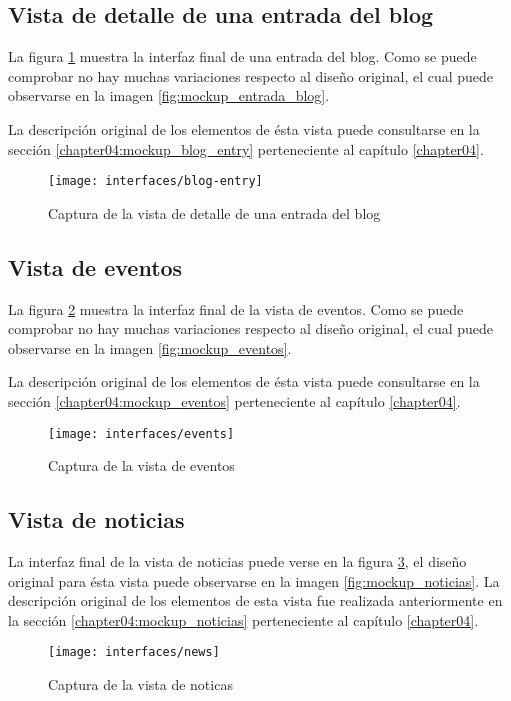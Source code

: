 \subsection{Vista de detalle de una entrada del blog}
La figura \ref{fig:interface_blog_entry} muestra la interfaz final de una entrada del blog.  Como se puede comprobar no hay muchas variaciones respecto al diseño original, el cual puede observarse en la imagen \ref{fig:mockup_entrada_blog}.

La descripción original de los elementos de ésta vista puede consultarse en la sección \ref{chapter04:mockup_blog_entry} perteneciente al capítulo \ref{chapter04}.

\begin{figure}[h]
	\centering
	\texttt{[image: interfaces/blog-entry]}
	\caption{Captura de la vista de detalle de una entrada del blog}
	\label{fig:interface_blog_entry}
\end{figure}

\subsection{Vista de eventos}
La figura \ref{fig:interface_eventos} muestra la interfaz final de la vista de eventos.  Como se puede comprobar no hay muchas variaciones respecto al diseño original, el cual puede observarse en la imagen \ref{fig:mockup_eventos}.

La descripción original de los elementos de ésta vista puede consultarse en la sección \ref{chapter04:mockup_eventos} perteneciente al capítulo \ref{chapter04}.

\begin{figure}[h]
	\centering
	\texttt{[image: interfaces/events]}
	\caption{Captura de la vista de eventos}
	\label{fig:interface_eventos}
\end{figure}


\subsection{Vista de noticias}
La interfaz final de la vista de noticias puede verse en la figura \ref{fig:interface_noticias}, el diseño original para ésta vista puede observarse en la imagen \ref{fig:mockup_noticias}.  La descripción original de los elementos de esta vista fue realizada anteriormente en la sección  \ref{chapter04:mockup_noticias} perteneciente al capítulo \ref{chapter04}.

\begin{figure}[h]
	\centering
	\texttt{[image: interfaces/news]}
	\caption{Captura de la vista de noticas}
	\label{fig:interface_noticias}
\end{figure}


